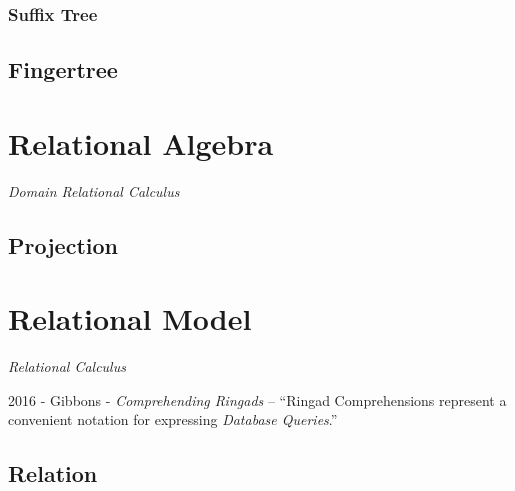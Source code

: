\subsubsection{Suffix Tree}\label{sec:suffix_tree}



\subsection{Fingertree}\label{sec:fingertree}



\section{Relational Algebra}\label{sec:relational_algebra}

\emph{Domain Relational Calculus}



\subsection{Projection}\label{sec:relational_projection}



\section{Relational Model}\label{sec:relational_model}

\emph{Relational Calculus}


2016 - Gibbons - \emph{Comprehending Ringads} -- ``Ringad Comprehensions
represent a convenient notation for expressing \emph{Database Queries}.''



\subsection{Relation}\label{sec:database_relation}

